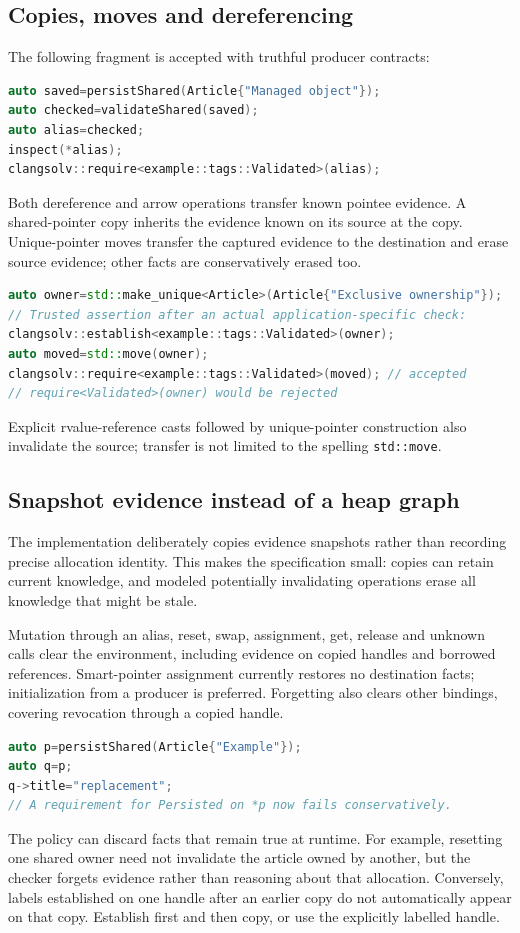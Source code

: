 \documentclass[11pt]{article}
\begin{document}
\subsection{Copies, moves and dereferencing}
The following fragment is accepted with truthful producer contracts:
\begin{lstlisting}[language=C++]
auto saved=persistShared(Article{"Managed object"});
auto checked=validateShared(saved);
auto alias=checked;
inspect(*alias);
clangsolv::require<example::tags::Validated>(alias);
\end{lstlisting}
Both dereference and arrow operations transfer known pointee evidence.
A shared-pointer copy inherits the evidence known on its source at the copy.
Unique-pointer moves transfer the captured evidence to the destination and
erase source evidence; other facts are conservatively erased too.

\begin{lstlisting}[language=C++]
auto owner=std::make_unique<Article>(Article{"Exclusive ownership"});
// Trusted assertion after an actual application-specific check:
clangsolv::establish<example::tags::Validated>(owner);
auto moved=std::move(owner);
clangsolv::require<example::tags::Validated>(moved); // accepted
// require<Validated>(owner) would be rejected
\end{lstlisting}
Explicit rvalue-reference casts followed by unique-pointer construction also
invalidate the source; transfer is not limited to the spelling \texttt{std::move}.

\subsection{Snapshot evidence instead of a heap graph}
The implementation deliberately copies evidence snapshots rather than
recording precise allocation identity. This makes the specification small:
copies can retain current knowledge, and modeled potentially invalidating
operations erase all knowledge that might be stale.

Mutation through an alias, reset, swap, assignment, get, release and unknown
calls clear the environment, including evidence on copied handles and borrowed
references. Smart-pointer assignment currently restores no destination facts;
initialization from a producer is preferred. Forgetting also clears other
bindings, covering revocation through a copied handle.

\begin{lstlisting}[language=C++]
auto p=persistShared(Article{"Example"});
auto q=p;
q->title="replacement";
// A requirement for Persisted on *p now fails conservatively.
\end{lstlisting}
The policy can discard facts that remain true at runtime. For example,
resetting one shared owner need not invalidate the article owned by another,
but the checker forgets evidence rather than reasoning about that allocation.
Conversely, labels established on one handle after an earlier copy do not
automatically appear on that copy. Establish first and then copy, or use the
explicitly labelled handle.
\end{document}
